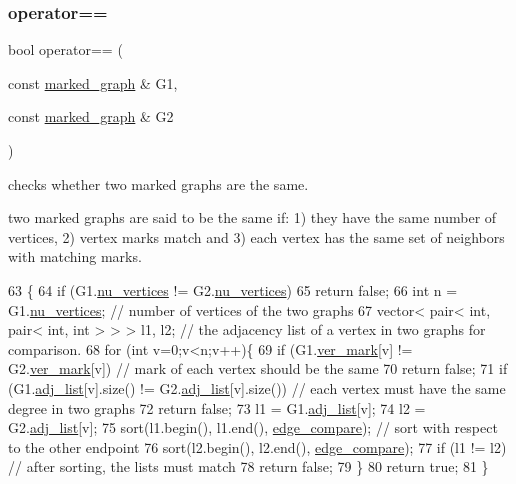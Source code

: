 \subsubsection{\texorpdfstring{operator==}{operator==}}
{\footnotesize\ttfamily bool operator== (\begin{DoxyParamCaption}\item[{const \hyperlink{classmarked__graph}{marked\+\_\+graph} \&}]{G1,  }\item[{const \hyperlink{classmarked__graph}{marked\+\_\+graph} \&}]{G2 }\end{DoxyParamCaption})\hspace{0.3cm}{\ttfamily [friend]}}



checks whether two marked graphs are the same. 

two marked graphs are said to be the same if\+: 1) they have the same number of vertices, 2) vertex marks match and 3) each vertex has the same set of neighbors with matching marks. 
\begin{DoxyCode}
63 \{
64   \textcolor{keywordflow}{if} (G1.\hyperlink{classmarked__graph_acf79c6aeb8f32614cb14a5baaa6c9f9b}{nu\_vertices} != G2.\hyperlink{classmarked__graph_acf79c6aeb8f32614cb14a5baaa6c9f9b}{nu\_vertices})
65     \textcolor{keywordflow}{return} \textcolor{keyword}{false};
66   \textcolor{keywordtype}{int} n = G1.\hyperlink{classmarked__graph_acf79c6aeb8f32614cb14a5baaa6c9f9b}{nu\_vertices}; \textcolor{comment}{// number of vertices of the two graphs}
67   vector< pair< int, pair< int, int > > > l1, l2; \textcolor{comment}{// the adjacency list of a vertex in two graphs for
       comparison. }
68   \textcolor{keywordflow}{for} (\textcolor{keywordtype}{int} v=0;v<n;v++)\{
69     \textcolor{keywordflow}{if} (G1.\hyperlink{classmarked__graph_ac83e9377dd4d8bb95be1ac949b127296}{ver\_mark}[v] != G2.\hyperlink{classmarked__graph_ac83e9377dd4d8bb95be1ac949b127296}{ver\_mark}[v]) \textcolor{comment}{// mark of each vertex should be the same}
70       \textcolor{keywordflow}{return} \textcolor{keyword}{false};
71     \textcolor{keywordflow}{if} (G1.\hyperlink{classmarked__graph_a1a0bf7ca413a278763f7c878b3b6fd6f}{adj\_list}[v].size() != G2.\hyperlink{classmarked__graph_a1a0bf7ca413a278763f7c878b3b6fd6f}{adj\_list}[v].size()) \textcolor{comment}{// each vertex must have the same
       degree in two graphs}
72       \textcolor{keywordflow}{return} \textcolor{keyword}{false};
73     l1 = G1.\hyperlink{classmarked__graph_a1a0bf7ca413a278763f7c878b3b6fd6f}{adj\_list}[v];
74     l2 = G2.\hyperlink{classmarked__graph_a1a0bf7ca413a278763f7c878b3b6fd6f}{adj\_list}[v];
75     sort(l1.begin(), l1.end(), \hyperlink{marked__graph_8cpp_a09dd24caed50b1d106e10538e688b6ac}{edge\_compare}); \textcolor{comment}{// sort with respect to the other endpoint}
76     sort(l2.begin(), l2.end(), \hyperlink{marked__graph_8cpp_a09dd24caed50b1d106e10538e688b6ac}{edge\_compare});
77     \textcolor{keywordflow}{if} (l1 != l2) \textcolor{comment}{// after sorting, the lists must match}
78       \textcolor{keywordflow}{return} \textcolor{keyword}{false};
79   \}
80   \textcolor{keywordflow}{return} \textcolor{keyword}{true};
81 \}
\end{DoxyCode}


